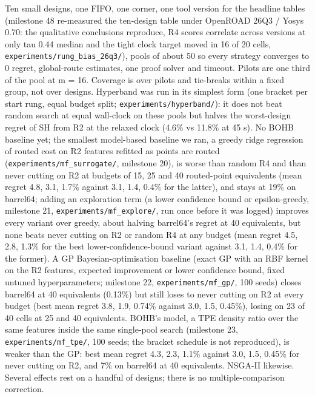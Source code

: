 \documentclass[conference]{IEEEtran}
\begin{document}
Ten small designs, one FIFO, one corner, one tool version for the
headline tables (milestone 48 re-measured the ten-design table under
OpenROAD 26Q3 / Yosys 0.70: the qualitative conclusions reproduce, R4
scores correlate across versions at only tau 0.44 median and the tight
clock target moved in 16 of 20 cells,
\texttt{experiments/\allowbreak{}rung\_\allowbreak{}bias\_\allowbreak{}26q3/\allowbreak{}}), pools of about 50 so every
strategy converges to 0 regret, global-route estimates, one proof solver
and timeout. Pilots are one third of the pool at m = 16. Coverage is
over pilots and tie-breaks within a fixed group, not over designs.
Hyperband was run in its simplest form (one bracket per start rung,
equal budget split; \texttt{experiments/\allowbreak{}hyperband/\allowbreak{}}): it does not beat
random search at equal wall-clock on these pools but halves the
worst-design regret of SH from R2 at the relaxed clock (4.6\% vs 11.8\%
at 45 s). No BOHB baseline yet; the smallest model-based baseline we
ran, a greedy ridge regression of routed cost on R2 features refitted as
points are routed (\texttt{experiments/\allowbreak{}mf\_\allowbreak{}surrogate/\allowbreak{}}, milestone 20),
is worse than random R4 and than never cutting on R2 at budgets of 15,
25 and 40 routed-point equivalents (mean regret 4.8, 3.1, 1.7\% against
3.1, 1.4, 0.4\% for the latter), and stays at 19\% on barrel64; adding
an exploration term (a lower confidence bound or epsilon-greedy,
milestone 21, \texttt{experiments/\allowbreak{}mf\_\allowbreak{}explore/\allowbreak{}}, run once before it was
logged) improves every variant over greedy, about halving barrel64's
regret at 40 equivalents, but none beats never cutting on R2 or random
R4 at any budget (mean regret 4.5, 2.8, 1.3\% for the best
lower-confidence-bound variant against 3.1, 1.4, 0.4\% for the former).
A GP Bayesian-optimisation baseline (exact GP with an RBF kernel on the
R2 features, expected improvement or lower confidence bound, fixed
untuned hyperparameters; milestone 22, \texttt{experiments/\allowbreak{}mf\_\allowbreak{}gp/\allowbreak{}}, 100
seeds) closes barrel64 at 40 equivalents (0.13\%) but still loses to
never cutting on R2 at every budget (best mean regret 3.8, 1.9, 0.74\%
against 3.0, 1.5, 0.45\%), losing on 23 of 40 cells at 25 and 40
equivalents. BOHB's model, a TPE density ratio over the same features
inside the same single-pool search (milestone 23,
\texttt{experiments/\allowbreak{}mf\_\allowbreak{}tpe/\allowbreak{}}, 100 seeds; the bracket schedule is not
reproduced), is weaker than the GP: best mean regret 4.3, 2.3, 1.1\%
against 3.0, 1.5, 0.45\% for never cutting on R2, and 7\% on barrel64 at
40 equivalents. NSGA-II likewise. Several effects rest on a handful of
designs; there is no multiple-comparison correction.
\end{document}
